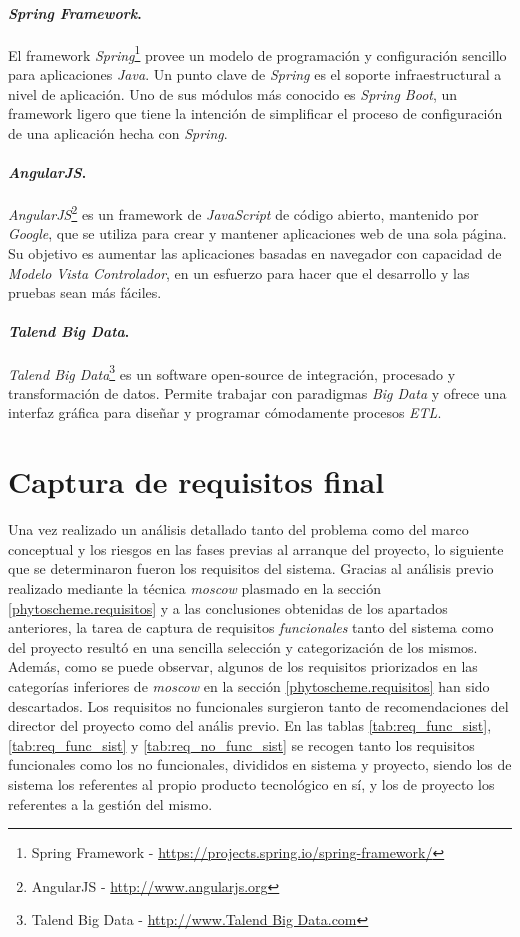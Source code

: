 \paragraph*{\textit{Spring Framework}.} El framework \textit{Spring}\footnote{Spring Framework - \url{https://projects.spring.io/spring-framework/}} provee un modelo de programación y configuración sencillo para aplicaciones \textit{Java}. Un punto clave de \textit{Spring} es el soporte infraestructural a nivel de aplicación. Uno de sus módulos más conocido es \textit{Spring Boot}, un framework ligero que tiene la intención de simplificar el proceso de configuración de una aplicación hecha con \textit{Spring}. 
\paragraph*{\textit{AngularJS}.} \textit{AngularJS}\footnote{AngularJS - \url{http://www.angularjs.org}} es un framework de \textit{JavaScript} de código abierto, mantenido por \textit{Google}, que se utiliza para crear y mantener aplicaciones web de una sola página. Su objetivo es aumentar las aplicaciones basadas en navegador con capacidad de \textit{Modelo Vista Controlador}, en un esfuerzo para hacer que el desarrollo y las pruebas sean más fáciles.
\paragraph*{\textit{Talend Big Data}.} \textit{Talend Big Data}\footnote{Talend Big Data - \url{http://www.Talend Big Data.com}} es un software open-source de integración, procesado y transformación de datos. Permite trabajar con paradigmas \textit{Big Data} y ofrece una interfaz gráfica para diseñar y programar cómodamente procesos \textit{ETL}. 

\section{Captura de requisitos final}  \label{analisis.requisitos}
Una vez realizado un análisis detallado tanto del problema como del marco conceptual y los riesgos en las fases previas al arranque del proyecto, lo  siguiente que se determinaron fueron los requisitos del sistema. Gracias al análisis previo realizado mediante la técnica \textit{\gls{moscow}} plasmado en la sección \ref{phytoscheme.requisitos} y a las conclusiones obtenidas de los apartados anteriores, la tarea de captura de requisitos \textit{funcionales} tanto del sistema como del proyecto resultó en una sencilla selección y categorización de los mismos. Además, como se puede observar, algunos de los requisitos priorizados en las categorías inferiores de \textit{\gls{moscow}} en la sección \ref{phytoscheme.requisitos} han sido descartados. Los requisitos no funcionales surgieron tanto de recomendaciones del director del proyecto como del anális previo. En las tablas \ref{tab:req_func_sist}, \ref{tab:req_func_sist} y \ref{tab:req_no_func_sist} se recogen tanto los requisitos funcionales como los no funcionales, divididos en sistema y proyecto, siendo los de sistema los referentes al propio producto tecnológico en sí, y los de proyecto los referentes a la gestión del mismo. 
\par

